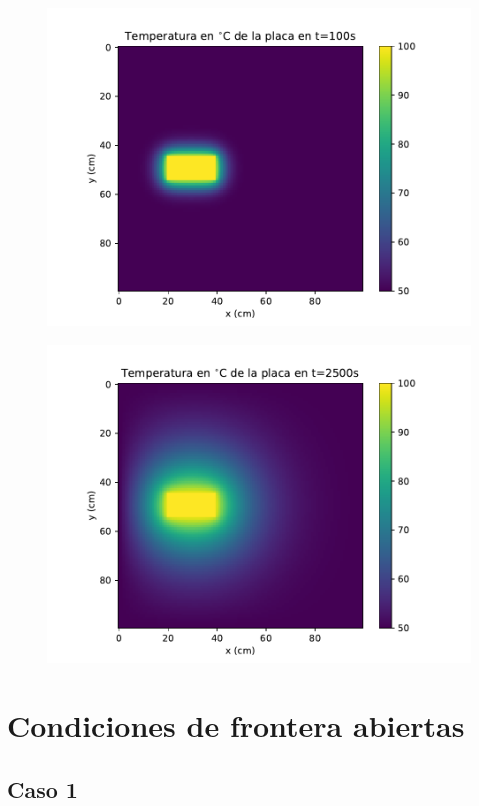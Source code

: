 \documentclass[12pt,letterpaper]{article}
\begin{document}
\begin{figure}[H]
\includegraphics{f2_100.pdf}
\centering
\end{figure}

\begin{figure}[H]
\includegraphics{f2_2500.pdf}
\centering
\end{figure}

\section*{Condiciones de frontera abiertas}

\subsection*{Caso 1}
\end{document}
